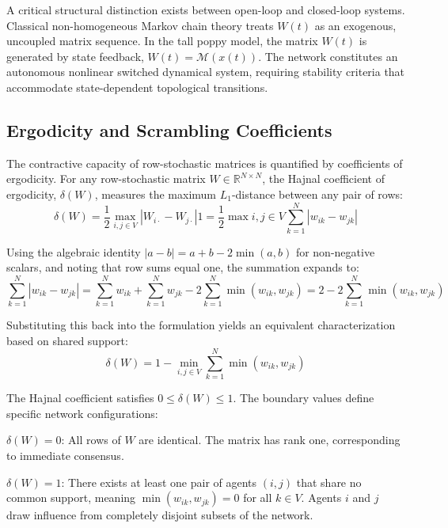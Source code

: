 A critical structural distinction exists between open-loop and closed-loop systems\cite{hajnal1958weak}. Classical non-homogeneous Markov chain theory treats ${W(t)}$ as an exogenous, uncoupled matrix sequence\cite{hajnal1958weak}. In the tall poppy model, the matrix $W(t)$ is generated by state feedback, $W(t) = \mathcal{M}(x(t))$\cite{hajnal1958weak}. The network constitutes an autonomous nonlinear switched dynamical system, requiring stability criteria that accommodate state-dependent topological transitions\cite{hajnal1958weak}.

\subsection{Ergodicity and Scrambling Coefficients}
The contractive capacity of row-stochastic matrices is quantified by coefficients of ergodicity\cite{degroot1974reaching}. For any row-stochastic matrix $W \in \mathbb{R}^{N \times N}$, the Hajnal coefficient of ergodicity, $\delta(W)$, measures the maximum $L_1$-distance between any pair of rows\cite{degroot1974reaching}: $$\delta(W) = \frac{1}{2} \max_{i, j \in V} |W_{i\cdot} - W_{j\cdot}|1 = \frac{1}{2} \max{i, j \in V} \sum_{k=1}^N |w_{ik} - w_{jk}|$$

Using the algebraic identity $|a - b| = a + b - 2\min(a, b)$ for non-negative scalars, and noting that row sums equal one, the summation expands to\cite{acemoglu2013opinion}: $$\sum_{k=1}^N |w_{ik} - w_{jk}| = \sum_{k=1}^N w_{ik} + \sum_{k=1}^N w_{jk} - 2 \sum_{k=1}^N \min(w_{ik}, w_{jk}) = 2 - 2 \sum_{k=1}^N \min(w_{ik}, w_{jk})$$

Substituting this back into the formulation yields an equivalent characterization based on shared support\cite{acemoglu2013opinion}: $$\delta(W) = 1 - \min_{i, j \in V} \sum_{k=1}^N \min(w_{ik}, w_{jk})$$

The Hajnal coefficient satisfies $0 \le \delta(W) \le 1$\cite{degroot1974reaching}. The boundary values define specific network configurations\cite{degroot1974reaching}:

$\delta(W) = 0$: All rows of $W$ are identical\cite{degroot1974reaching}. The matrix has rank one, corresponding to immediate consensus\cite{degroot1974reaching}.

$\delta(W) = 1$: There exists at least one pair of agents $(i, j)$ that share no common support, meaning $\min(w_{ik}, w_{jk}) = 0$ for all $k \in V$\cite{degroot1974reaching,acemoglu2013opinion}. Agents $i$ and $j$ draw influence from completely disjoint subsets of the network\cite{degroot1974reaching}.

